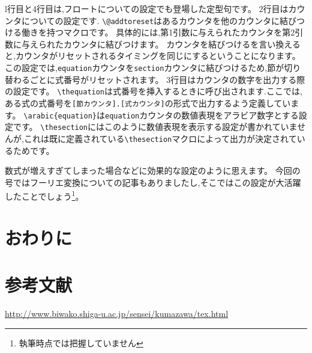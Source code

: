 l行目と4行目は,フロートについての設定でも登場した定型句です。
2行目はカウンタについての設定です. \verb|\@addtoreset|はあるカウンタを他のカウンタに結びつける働きを持つマクロです。
具体的には,第1引数に与えられたカウンタを第2引数に与えられたカウンタに結びつけます。
カウンタを結びつけるを言い換えると,カウンタがリセットされるタイミングを同じにするということになります。
この設定では,\verb|equation|カウンタを\verb|section|カウンタに結びつけるため,節が切り替わるごとに式番号がリセットされます。
3行目はカウンタの数字を出力する際の設定です。
\verb|\thequation|は式番号を挿入するときに呼び出されます.ここでは,ある式の式番号を\verb|[節カウンタ].[式カウンタ]|の形式で出力するよう定義しています。
\verb|\arabic{equation}|は\verb|equation|カウンタの数値表現をアラビア数字とする設定です。
\verb|\thesection|にはこのように数値表現を表示する設定が書かれていませんが,これは既に定義されている\verb|\thesection|マクロによって出力が決定されているためです。

数式が増えすぎてしまった場合などに効果的な設定のように思えます。
今回の号ではフーリエ変換についての記事もありましたし,そこではこの設定が大活躍したことでしょう\footnote{執筆時点では把握していません}。

\section{おわりに}


\section*{参考文献}
\url{http://www.biwako.shiga-u.ac.jp/sensei/kumazawa/tex.html}
